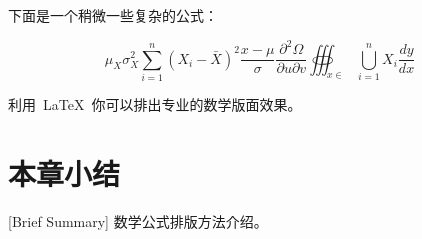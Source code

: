 下面是一个稍微一些复杂的公式：

\begin{equation}
  {\mu _X}\sigma _X^2\sum\limits_{i = 1}^n {{{({X_i} - \bar X)}^2}} \frac{{x - \mu }}{\sigma }\frac{{{\partial ^2}\Omega }}{{\partial u\partial v}}\oiiint\nolimits_{x \in }
  {\bigcup\limits_{i = 1}^n {{X_i}} \frac{{dy}}{{dx}}}
\end{equation}

利用~\LaTeX~你可以排出专业的数学版面效果。


\section{本章小结}[Brief Summary]
数学公式排版方法介绍。
